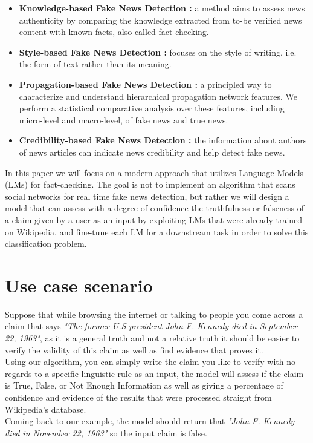 \documentclass[10pt, english]{report}
\begin{document}
\begin{itemize}
\item \textbf{Knowledge-based Fake News Detection \cite{chernyavskiy2021whatthewikifact}:} a method aims to assess news authenticity by comparing the knowledge extracted from to-be verified news content with known facts, also called fact-checking.
\item \textbf{Style-based Fake News Detection \cite{przybyla2020capturing}:} focuses on the style of writing, i.e. the form of text rather than its meaning.
\item \textbf{Propagation-based Fake News Detection \cite{shu2020hierarchical}:} a principled way to characterize and understand hierarchical propagation network features. We perform a statistical comparative analysis over these features, including micro-level and macro-level, of fake news and true news.
\item \textbf{Credibility-based Fake News Detection \cite{sitaula2020credibility}:} the information about authors of news articles can indicate news credibility and help detect fake news.
\end{itemize}

In this paper we will focus on a modern approach that utilizes Language Models (LMs) for fact-checking. The goal is not to implement an algorithm that scans social networks for real time fake news detection, but rather we will design a model that can assess with a degree of confidence the truthfulness or falseness of a claim given by a user as an input by exploiting LMs that were already trained on Wikipedia, and fine-tune each LM for a downstream task in order to solve this classification problem.

\section{Use case scenario}
Suppose that while browsing the internet or talking to people you come across a claim that says \textit{"The former U.S president John F. Kennedy died in September 22, 1963"}, as it is a general truth and not a relative truth it should be easier to verify the validity of this claim as well as find evidence that proves it.\\
Using our algorithm, you can simply write the claim you like to verify with no regards to a specific linguistic rule as an input, the model will assess if the claim is True, False, or Not Enough Information as well as giving a percentage of confidence and evidence of the results that were processed straight from Wikipedia's database.\\
Coming back to our example, the model should return that \textit{"John F. Kennedy died in November 22, 1963"} so the input claim is false.\\
\end{document}
